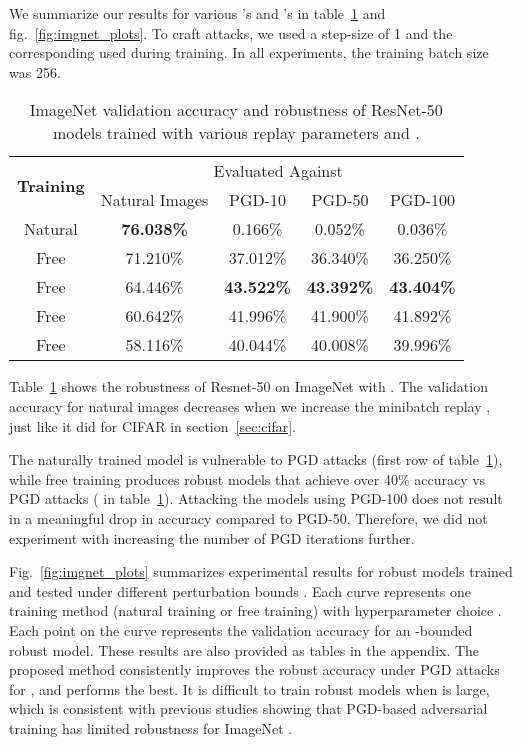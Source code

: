 \documentclass{article}
\begin{document}
We summarize our results for various 's and 's in table~\ref{tab:imagenet_robustness_eps2} and fig.~\ref{fig:imgnet_plots}.  
To craft attacks, we used a step-size of 1 and the corresponding  used during training. In all experiments, the training batch size was 256. 
\begin{table}
    \centering
    \caption{ImageNet validation accuracy and robustness of ResNet-50 models trained with various replay parameters and .
    } 
    \begin{tabular}{|c||c|c|c|c|}
    \hline
     \multirow{2}{*}{\textbf{Training}} & \multicolumn{4}{c|}{ Evaluated Against} \\ \cline{2-5} & Natural Images & PGD-10 & PGD-50 & PGD-100 \\ 
    \hline\hline
    Natural & \textbf{76.038\%} & 0.166\% & 0.052\%& 0.036\%\\
    \hline \hline
    Free  & 71.210\% & 37.012\% & 36.340\%& 36.250\%\\
    \hline
    Free  & 64.446\% & \textbf{43.522\%} & \textbf{43.392\%} & \textbf{43.404\%}\\
    \hline
    Free  & 60.642\% & 41.996\% & 41.900\%& 41.892\%\\
    \hline
    Free  & 58.116\% & 40.044\% & 40.008\%& 39.996\%\\
    \hline
    \end{tabular}
    \label{tab:imagenet_robustness_eps2}
\end{table}
Table~\ref{tab:imagenet_robustness_eps2} shows the robustness of Resnet-50 on ImageNet with . The validation accuracy for natural images decreases when we increase the minibatch replay , just like it did for CIFAR in section~\ref{sec:cifar}.

The naturally trained model is vulnerable to PGD attacks (first row of table~\ref{tab:imagenet_robustness_eps2}), while free training produces robust models that achieve over 40\% accuracy vs PGD attacks ( in table~\ref{tab:imagenet_robustness_eps2}). 
Attacking the models using PGD-100 does not result in a meaningful drop in accuracy compared to PGD-50. Therefore, we did not experiment with increasing the number of PGD iterations further. 

Fig.~\ref{fig:imgnet_plots} summarizes experimental results for robust models trained and tested under different perturbation bounds . Each curve represents one training method (natural training or free training) with hyperparameter choice . Each point on the curve represents the validation accuracy for an -bounded robust model.
These results are also provided as tables in the appendix. 
The proposed method consistently improves the robust accuracy under PGD attacks for , and  performs the best. 
It is difficult to train robust models when  is large, which is consistent with previous studies showing that PGD-based adversarial training has limited robustness for ImageNet \citep{kannan2018adversarial}.
\end{document}
